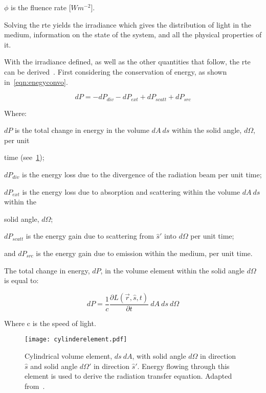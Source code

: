 \indent $\phi$ is the fluence rate [$W m^{-2}$].

\medskip

Solving the \gls*{rte} yields the irradiance which gives the distribution of light in the medium, information on the state of the system, and all the physical properties of it.

With the irradiance defined, as well as the other quantities that follow, the \gls*{rte} can be derived~\cite{chandrasekhar2013radiative,wang2012biomedical}. First considering the conservation of energy, as shown in~\cref{eqn:enegyconvo}.

\begin{equation}
	dP = -dP_{div} - dP_{ext} + dP_{scatt} + dP_{src}
	\label{eqn:enegyconvo}
\end{equation}

\noindent Where:

\indent $dP$ is the total change in energy in the volume $dA\ ds$ within the solid angle, $d\Omega$, per unit 

\indent time (see~\cref{fig:energydiag2});

\indent $dP_{div}$ is the energy loss due to the divergence of the radiation beam per unit time;

\indent $dP_{ext}$ is the energy loss due to absorption and scattering within the volume $dA\ ds$ within the

\indent  solid angle, $d\Omega$;

\indent $dP_{scatt}$ is the energy gain due to scattering from $\hat{s}'$ into $d\Omega$ per unit time;

\indent and $dP_{src}$ is the energy gain due to emission within the medium, per unit time.

\medskip

The total change in energy, $dP$, in the volume element within the solid angle $d\Omega$ is equal to:

\begin{equation}
	dP=\frac{1}{c}\frac{\partial L(\vec{r},\hat{s},t)}{\partial t}\ dA\ ds\ d\Omega
	\label{eqn:p}
\end{equation}

\noindent Where c is the speed of light.

\medskip

\begin{figure}[!htbp]
	\centering
	\texttt{[image: cylinderelement.pdf]}
	\caption{Cylindrical volume element, $ds\ dA$, with solid angle $d\Omega$ in direction $\hat{s}$ and solid angle $d\Omega'$ in direction $\hat{s}'$. Energy flowing through this element is used to derive the radiation transfer equation. Adapted from~\cite{wang2012biomedical,chandrasekhar2013radiative}.}
	\label{fig:energydiag2}
\end{figure}

